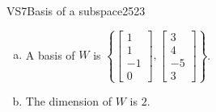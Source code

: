 \begin{exercise}{VS7}{Basis of a subspace}{2523}
\begin{exerciseAnswer}
 

\begin{enumerate}[(a)]
\item 

A basis of \(W\) is \(\left\{ \left[\begin{array}{c}
1 \\
1 \\
-1 \\
0
\end{array}\right] , \left[\begin{array}{c}
3 \\
4 \\
-5 \\
3
\end{array}\right] \right\}\).


\item 

The dimension of \(W\) is \(2\).


\end{enumerate}

     \end{exerciseAnswer}
 \end{exercise}


